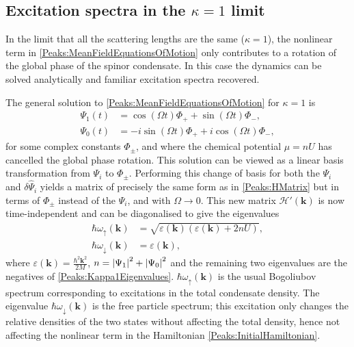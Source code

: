 \subsection{Excitation spectra in the $\kappa = 1$ limit}
\label{Peaks:Kappa1Limit}
In the limit that all the scattering lengths are the same ($\kappa = 1$), the nonlinear term in \eqref{Peaks:MeanFieldEquationsOfMotion} only contributes to a rotation of the global phase of the spinor condensate. In this case the dynamics can be solved analytically and familiar excitation spectra recovered.

The general solution to \eqref{Peaks:MeanFieldEquationsOfMotion} for $\kappa = 1$ is
\begin{subequations}
    \label{Peaks:Kappa1MeanFieldSolution}
    \begin{align}
        \Psi_1(t) &= \cos(\Omega t) \Phi_+ + \sin(\Omega t) \Phi_-, \\
        \Psi_0(t) &= -i\sin(\Omega t) \Phi_+ + i\cos(\Omega t) \Phi_-,
    \end{align}
\end{subequations}
for some complex constants $\Phi_\pm$, and where the chemical potential $\mu = n U$ has cancelled the global phase rotation. This solution can be viewed as a linear basis transformation from $\Psi_i$ to $\Phi_\pm$. Performing this change of basis for both the $\Psi_i$ and $\delta \hat{\Psi}_i$ yields a matrix of precisely the same form as in \eqref{Peaks:HMatrix} but in terms of $\Phi_\pm$ instead of the $\Psi_i$, and with $\Omega \rightarrow 0$. This new matrix $\mathcal{H}'(\bm{k})$ is now time-independent and can be diagonalised to give the eigenvalues
\begin{subequations}
    \label{Peaks:Kappa1Eigenvalues}
    \begin{align}
        \hbar \omega_\uparrow(\bm{k}) &= \sqrt{\varepsilon(\bm{k})\left(\varepsilon(\bm{k}) + 2 n U\right)},\\
        \hbar \omega_\downarrow(\bm{k}) &= \varepsilon(\bm{k}),
    \end{align}
\end{subequations}
where $\displaystyle\varepsilon(\bm{k}) = \frac{\hbar^2\bm{k}^2}{2M}$, $n= \left|\Psi_1\right|^2 + \left|\Psi_0\right|^2$ and the remaining two eigenvalues are the negatives of \eqref{Peaks:Kappa1Eigenvalues}. $\hbar \omega_\uparrow(\bm{k})$ is the usual Bogoliubov spectrum \citep{Bogoliubov:1947} corresponding to excitations in the total condensate density. The eigenvalue $\hbar \omega_\downarrow(\bm{k})$ is the free particle spectrum; this excitation only changes the relative densities of the two states without affecting the total density, hence not affecting the nonlinear term in the Hamiltonian \eqref{Peaks:InitialHamiltonian}.

